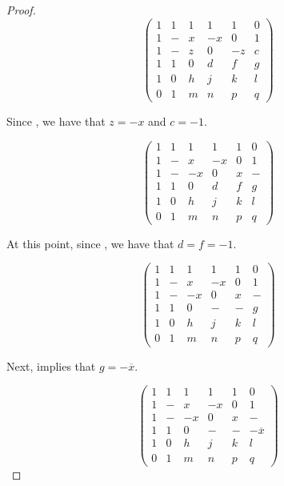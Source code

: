 \begin{lemma}
\begin{proof}
\begin{equation} \label{mat:1-1}
\left(\begin{array}{rrrrrr}
 1 &  1 & 1 & 1 & 1 & 0 \\
 1 &  - & x & -x & 0 & 1 \\
 1 &  - & z & 0 & -z & c \\ \hline
 1 &  1 & 0 & d & f & g \\
 1 &  0 & h & j & k & l \\
 0 &  1 & m & n & p & q
\end{array}\right)
\end{equation}

Since , we have that $z=-x$ and $c=-1$.

\begin{equation} \label{mat:1-2}
\left(\begin{array}{rrrrrr}
 1 &  1 & 1 & 1 & 1 & 0 \\
 1 &  - & x & -x & 0 & 1 \\
 1 &  - & -x & 0 & x & - \\ \hline
 1 &  1 & 0 & d & f & g \\
 1 &  0 & h & j & k & l \\
 0 &  1 & m & n & p & q
\end{array}\right)
\end{equation}

At this point, since , we have that $d = f = -1$.

\begin{equation} \label{mat:1-3}
\left(\begin{array}{rrrrrr}
 1 &  1 & 1 & 1 & 1 & 0 \\
 1 &  - & x & -x & 0 & 1 \\
 1 &  - & -x & 0 & x & - \\
 1 &  1 & 0 & - & - & g \\ \hline
 1 &  0 & h & j & k & l \\
 0 &  1 & m & n & p & q
\end{array}\right)
\end{equation}

Next,  implies that $g = -\overline{x}$.

\begin{equation}  \label{mat:1-4}
\left(\begin{array}{rrrrrr}
 1 &  1 & 1 & 1 & 1 & 0 \\
 1 &  - & x & -x & 0 & 1 \\
 1 &  - & -x & 0 & x & - \\
 1 &  1 & 0 & - & - & -\overline{x} \\ \hline
 1 &  0 & h & j & k & l \\
 0 &  1 & m & n & p & q
\end{array}\right)
\end{equation}


\end{proof}
\end{lemma}

